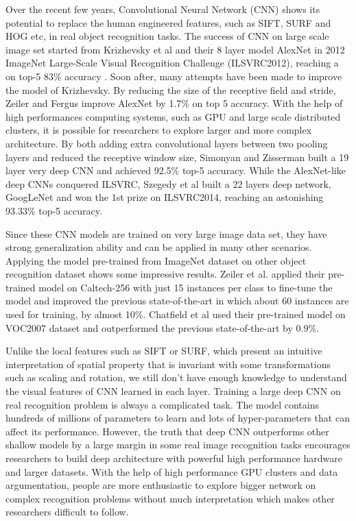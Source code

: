 ﻿Over the recent few years, Convolutional Neural Network (CNN) shows its potential to replace the human engineered features, such as SIFT\cite{lowe1999object}, SURF\cite{bay2006surf} and HOG\cite{dalal2005histograms} etc, in real object recognition tasks. The success of CNN on large scale image set started from Krizhevsky et al\cite{krizhevsky2012imagenet} and their 8 layer model AlexNet in 2012 ImageNet Large-Scale Visual Recognition Challenge (ILSVRC2012), reaching a on top-5 83\% accuracy . Soon after, many attempts have been made to improve the model of Krizhevsky.
By reducing the size of the receptive field and stride, Zeiler and Fergus improve AlexNet by 1.7\% on top 5 accuracy\cite{zeiler2014visualizing}. With the help of high performances computing systems, such as GPU and large scale distributed clusters, it is possible for researchers to explore larger and more complex architecture. By both adding extra convolutional layers between two pooling layers and reduced the receptive window size, Simonyan and Zisserman built a 19 layer very deep CNN and achieved 92.5\% top-5 accuracy\cite{simonyan2014very}. While the AlexNet-like deep CNNs conquered ILSVRC, Szegedy et al built a 22 layers deep network, GoogLeNet \cite{szegedy2014going} and won the 1st prize on ILSVRC2014, reaching an astonishing 93.33\% top-5 accuracy.

Since these CNN models are trained on very large image data set, they have strong generalization ability and can be applied in many other scenarios. Applying the model pre-trained from ImageNet dataset on other object recognition dataset shows some impressive results.
Zeiler et al. applied their pre-trained model on Caltech-256 with just 15 instances per class to fine-tune the model and improved the previous state-of-the-art in which about 60 instances are used for training, by almost 10\%\cite{zeiler2014visualizing}.
Chatfield et al used their pre-trained model on VOC2007 dataset and outperformed the previous state-of-the-art by 0.9\%\cite{Chatfield14}.

Unlike the local features such as SIFT or SURF, which present an intuitive interpretation of spatial property that is invariant with some transformations such as scaling and rotation, we still don't have enough knowledge to understand the visual features of CNN learned in each layer. Training a large deep CNN on real recognition problem is always a complicated task. The model contains hundreds of millions of parameters to learn and lots of hyper-parameters that can affect its performance. However, the truth that deep CNN outperforms other shallow models by a large margin in some real image recognition tasks encourages researchers to build deep architecture with powerful high performance hardware and larger datasets. With the help of high performance GPU clusters and data argumentation, people are more enthusiastic to explore bigger network on complex recognition problems without much interpretation which makes other researchers difficult to follow.

